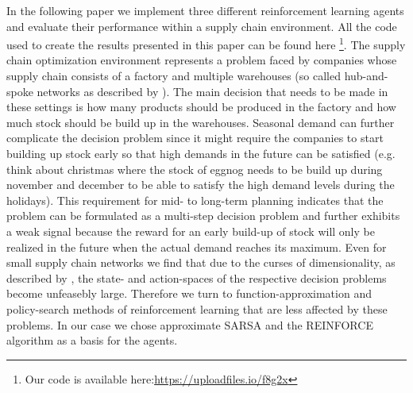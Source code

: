 \documentclass[journal, a4paper]{IEEEtran}
\theoremstyle{plain}
\theoremstyle{definition}
\begin{document}
In the following paper we implement three different reinforcement learning agents and evaluate their performance within a supply chain environment. All the code used to create the results presented in this paper can be found here \footnote{Our code is available here:\url{https://uploadfiles.io/f8g2x}}. \newline
The supply chain optimization environment represents a problem faced by companies whose supply chain consists of a factory and multiple warehouses (so called hub-and-spoke networks as described by \cite{MFL}). The main decision that needs to be made in these settings is how many products should be produced in the factory and how much stock should be build up in the warehouses. Seasonal demand can further complicate the decision problem since it might require the companies to start building up stock early so that high demands in the future can be satisfied (e.g. think about christmas where the stock of eggnog needs to be build up during november and december to be able to satisfy the high demand levels during the holidays). This requirement for mid- to long-term planning indicates that the problem can be formulated as a multi-step decision problem and further exhibits a weak signal because the reward for an early build-up of stock will only be realized in the future when the actual demand reaches its maximum. \newline
Even for small supply chain networks we find that due to the curses of dimensionality, as described by \cite{PowellADP}, the state- and action-spaces of the respective decision problems become unfeasebly large. Therefore we turn to function-approximation and policy-search methods of reinforcement learning that are less affected by these problems. In our case we chose approximate SARSA and the REINFORCE algorithm as a basis for the agents.
\end{document}
